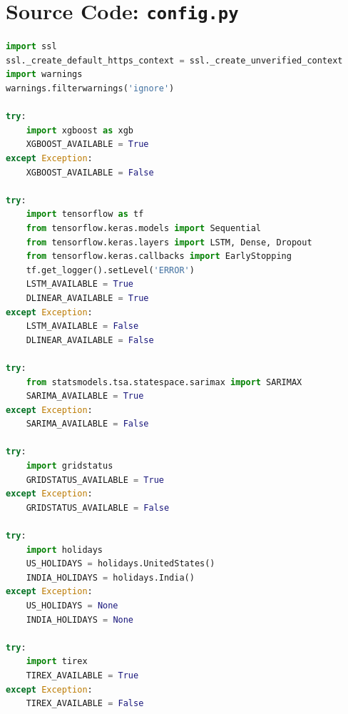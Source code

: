 \documentclass[12pt,a4paper,twoside,fleqn]{report}
\begin{document}
\section{Source Code: \texttt{config.py}}
\begin{lstlisting}[language=Python, breaklines=true, basicstyle=\ttfamily\scriptsize, caption=config.py]
import ssl
ssl._create_default_https_context = ssl._create_unverified_context
import warnings
warnings.filterwarnings('ignore')

try:
    import xgboost as xgb
    XGBOOST_AVAILABLE = True
except Exception:
    XGBOOST_AVAILABLE = False

try:
    import tensorflow as tf
    from tensorflow.keras.models import Sequential
    from tensorflow.keras.layers import LSTM, Dense, Dropout
    from tensorflow.keras.callbacks import EarlyStopping
    tf.get_logger().setLevel('ERROR')
    LSTM_AVAILABLE = True
    DLINEAR_AVAILABLE = True
except Exception:
    LSTM_AVAILABLE = False
    DLINEAR_AVAILABLE = False

try:
    from statsmodels.tsa.statespace.sarimax import SARIMAX
    SARIMA_AVAILABLE = True
except Exception:
    SARIMA_AVAILABLE = False

try:
    import gridstatus
    GRIDSTATUS_AVAILABLE = True
except Exception:
    GRIDSTATUS_AVAILABLE = False

try:
    import holidays
    US_HOLIDAYS = holidays.UnitedStates()
    INDIA_HOLIDAYS = holidays.India()
except Exception:
    US_HOLIDAYS = None
    INDIA_HOLIDAYS = None

try:
    import tirex
    TIREX_AVAILABLE = True
except Exception:
    TIREX_AVAILABLE = False




\end{lstlisting}
\end{document}
